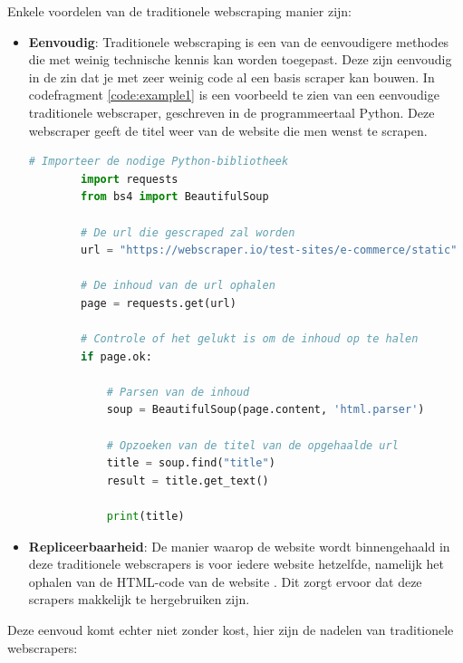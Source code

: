 Enkele voordelen van de traditionele webscraping manier zijn:
\begin{itemize}
    \item \textbf{Eenvoudig}: Traditionele webscraping is een van de eenvoudigere methodes die met weinig technische kennis kan worden toegepast. Deze zijn eenvoudig in de zin dat je met zeer weinig code al een basis scraper kan bouwen. In codefragment \ref{code:example1} is een voorbeeld te zien van een eenvoudige traditionele webscraper, geschreven in de programmeertaal Python. Deze webscraper geeft de titel weer van de website die men wenst te scrapen.

    \begin{lstlisting}[language=python, captionpos=b, caption={Een voorbeeld van een eenvoudige webscraper.}, label={code:example1}]
        # Importeer de nodige Python-bibliotheek
        import requests
        from bs4 import BeautifulSoup

        # De url die gescraped zal worden
        url = "https://webscraper.io/test-sites/e-commerce/static"

        # De inhoud van de url ophalen
        page = requests.get(url)

        # Controle of het gelukt is om de inhoud op te halen
        if page.ok:

            # Parsen van de inhoud
            soup = BeautifulSoup(page.content, 'html.parser')

            # Opzoeken van de titel van de opgehaalde url
            title = soup.find("title")
            result = title.get_text()

            print(title)
    \end{lstlisting}

    \item \textbf{Repliceerbaarheid}: De manier waarop de website wordt binnengehaald in deze traditionele webscrapers is voor iedere website hetzelfde, namelijk het ophalen van de HTML-code van de website . Dit zorgt ervoor dat deze scrapers makkelijk te hergebruiken zijn.
\end{itemize}

Deze eenvoud komt echter niet zonder kost, hier zijn de nadelen van traditionele webscrapers:

